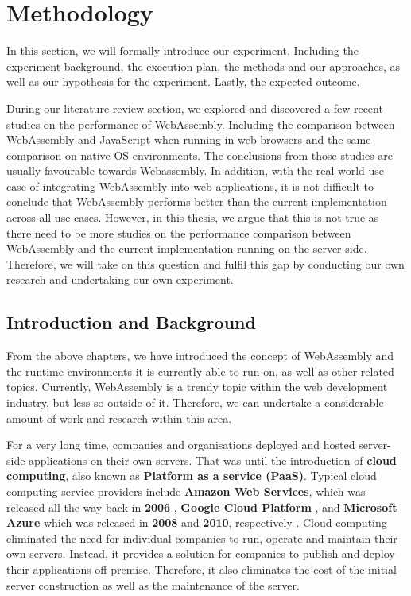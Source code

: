 \chapter{Methodology} \label{chap:methodology}

In this section, we will formally introduce our experiment. Including the experiment background, the execution plan, the methods and our approaches, as well as our hypothesis for the experiment. Lastly, the expected outcome.

During our literature review section, we explored and discovered a few recent studies on the performance of WebAssembly. Including the comparison between WebAssembly and JavaScript when running in web browsers and the same comparison on native OS environments. The conclusions from those studies are usually favourable towards Webassembly. In addition, with the real-world use case of integrating WebAssembly into web applications, it is not difficult to conclude that WebAssembly performs better than the current implementation across all use cases. However, in this thesis, we argue that this is not true as there need to be more studies on the performance comparison between WebAssembly and the current implementation running on the server-side. Therefore, we will take on this question and fulfil this gap by conducting our own research and undertaking our own experiment.

\bigskip
\section{Introduction and Background}

From the above chapters, we have introduced the concept of WebAssembly and the runtime environments it is currently able to run on, as well as other related topics. Currently, WebAssembly is a trendy topic within the web development industry, but less so outside of it. Therefore, we can undertake a considerable amount of work and research within this area.

For a very long time, companies and organisations deployed and hosted server-side applications on their own servers. That was until the introduction of \textbf{cloud computing}, also known as \textbf{Platform as a service (PaaS)}. Typical cloud computing service providers include \textbf{Amazon Web Services}, which was released all the way back in \textbf{2006} \cite{eva1}, \textbf{Google Cloud Platform} \cite{eva2}, and \textbf{Microsoft Azure} which was released in \textbf{2008} and \textbf{2010}, respectively \cite{eva3}. Cloud computing eliminated the need for individual companies to run, operate and maintain their own servers. Instead, it provides a solution for companies to publish and deploy their applications off-premise. Therefore, it also eliminates the cost of the initial server construction as well as the maintenance of the server.

